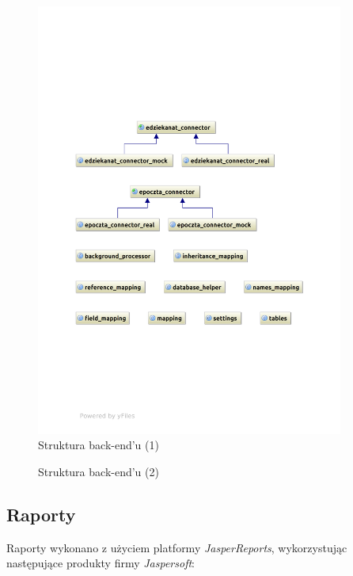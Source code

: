 \newpage
\begin{figure}[H]
\begin{center}
\includegraphics[width=0.9\textwidth]{figures/lw/backend1.pdf} 
\end{center}
\caption{Struktura back-end'u (1)}\label{rys:back-end1}
\end{figure}
\newpage
\begin{figure}[H]
\begin{center}
 
\end{center}
\caption{Struktura back-end'u (2)}\label{rys:back-end2}
\end{figure}
\newpage

\subsection{Raporty}
\label{Chapter661}

Raporty wykonano z użyciem platformy \textit{JasperReports}, wykorzystując następujące produkty firmy \textit{Jaspersoft}:

